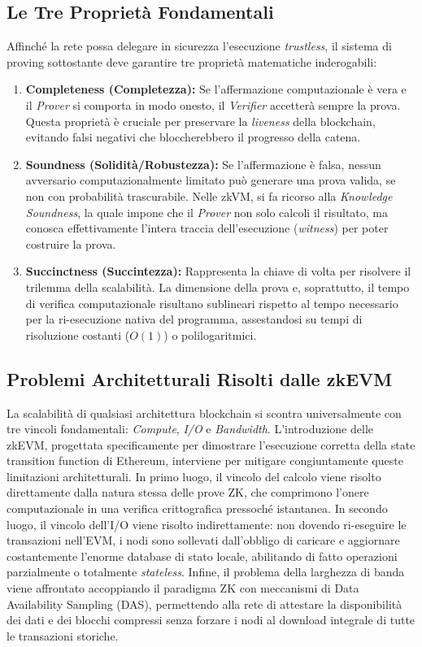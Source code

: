 \documentclass[12pt,a4paper,openright,twoside]{report}
\begin{document}
\subsection{Le Tre Proprietà Fondamentali}

Affinché la rete possa delegare in sicurezza l'esecuzione \textit{trustless}, il sistema di proving sottostante deve garantire tre proprietà matematiche inderogabili:
\begin{enumerate}
    \item \textbf{Completeness (Completezza):} Se l'affermazione computazionale è vera e il \textit{Prover} si comporta in modo onesto, il \textit{Verifier} accetterà sempre la prova. Questa proprietà è cruciale per preservare la \textit{liveness} della blockchain, evitando falsi negativi che bloccherebbero il progresso della catena.
    \item \textbf{Soundness (Solidità/Robustezza):} Se l'affermazione è falsa, nessun avversario computazionalmente limitato può generare una prova valida, se non con probabilità trascurabile. Nelle zkVM, si fa ricorso alla \textit{Knowledge Soundness}, la quale impone che il \textit{Prover} non solo calcoli il risultato, ma conosca effettivamente l'intera traccia dell'esecuzione (\textit{witness}) per poter costruire la prova.
    \item \textbf{Succinctness (Succintezza):} Rappresenta la chiave di volta per risolvere il trilemma della scalabilità. La dimensione della prova e, soprattutto, il tempo di verifica computazionale risultano sublineari rispetto al tempo necessario per la ri-esecuzione nativa del programma, assestandosi su tempi di risoluzione costanti ($O(1)$) o polilogaritmici.\end{enumerate}

\subsection{Problemi Architetturali Risolti dalle zkEVM}

La scalabilità di qualsiasi architettura blockchain si scontra universalmente con tre vincoli fondamentali: \textit{Compute}, \textit{I/O} e \textit{Bandwidth}. L'introduzione delle zkEVM, progettata specificamente per dimostrare l'esecuzione corretta della state transition function di Ethereum, interviene per mitigare congiuntamente queste limitazioni architetturali. In primo luogo, il vincolo del calcolo viene risolto direttamente dalla natura stessa delle prove ZK, che comprimono l'onere computazionale in una verifica crittografica pressoché istantanea. In secondo luogo, il vincolo dell'I/O viene risolto indirettamente: non dovendo ri-eseguire le transazioni nell'EVM, i nodi sono sollevati dall'obbligo di caricare e aggiornare costantemente l'enorme database di stato locale, abilitando di fatto operazioni parzialmente o totalmente \textit{stateless}. Infine, il problema della larghezza di banda viene affrontato accoppiando il paradigma ZK con meccanismi di Data Availability Sampling (DAS), permettendo alla rete di attestare la disponibilità dei dati e dei blocchi compressi senza forzare i nodi al download integrale di tutte le transazioni storiche.
\end{document}
